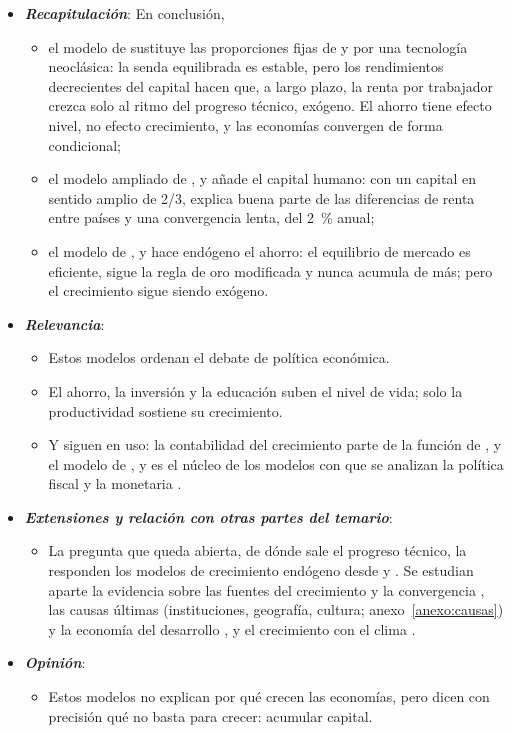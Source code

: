 \documentclass[11pt]{article}
\begin{document}
\begin{itemize}
\item \textbf{\emph{Recapitulación}}: En conclusión,
  \begin{itemize}
  \item el modelo de  sustituye las proporciones fijas de  y  por una tecnología neoclásica: la senda equilibrada es estable, pero los rendimientos decrecientes del capital hacen que, a largo plazo, la renta por trabajador crezca solo al ritmo del progreso técnico, exógeno. El ahorro tiene efecto nivel, no efecto crecimiento, y las economías convergen de forma condicional;
  \item el modelo ampliado de ,  y  añade el capital humano: con un capital en sentido amplio de 2/3, explica buena parte de las diferencias de renta entre países y una convergencia lenta, del 2~\% anual;
  \item el modelo de ,  y  hace endógeno el ahorro: el equilibrio de mercado es eficiente, sigue la regla de oro modificada y nunca acumula de más; pero el crecimiento sigue siendo exógeno.
  \end{itemize}
\item \textbf{\emph{Relevancia}}:
  \begin{itemize}
  \item Estos modelos ordenan el debate de política económica.

  \item El ahorro, la inversión y la educación suben el nivel de vida; solo la productividad sostiene su crecimiento.

  \item Y siguen en uso: la contabilidad del crecimiento parte de la función de  , y el modelo de ,  y  es el núcleo de los modelos con que se analizan la política fiscal y la monetaria .
  \end{itemize}
\item \textbf{\emph{Extensiones y relación con otras partes del temario}}:
  \begin{itemize}
  \item La pregunta que queda abierta, de dónde sale el progreso técnico, la responden los modelos de crecimiento endógeno desde \textcite{Romer1986Increasing} y \textcite{Lucas1988} . Se estudian aparte la evidencia sobre las fuentes del crecimiento y la convergencia , las causas últimas (instituciones, geografía, cultura; anexo~\ref{anexo:causas}) y la economía del desarrollo , y el crecimiento con el clima .
  \end{itemize}
\item \textbf{\emph{Opinión}}:
  \begin{itemize}
  \item Estos modelos no explican por qué crecen las economías, pero dicen con precisión qué no basta para crecer: acumular capital.


\end{itemize}
\end{itemize}
\end{document}
